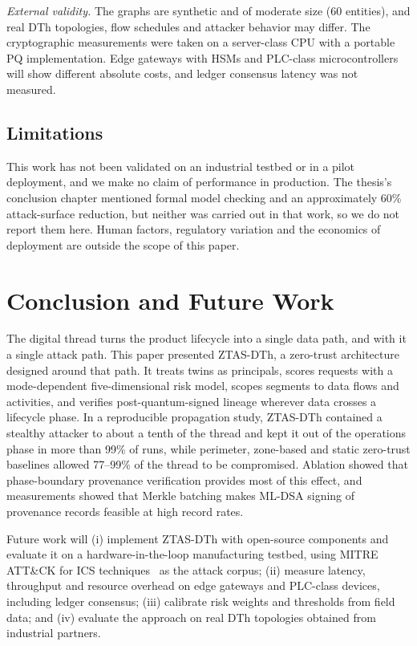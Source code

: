 \documentclass[journal]{IEEEtran}
\newcommand{\ztas}{ZTAS-DTh}
\begin{document}
\emph{External validity.} The graphs are synthetic and of moderate size (60 entities), and real DTh topologies, flow schedules and attacker behavior may differ. The cryptographic measurements were taken on a server-class CPU with a portable PQ implementation. Edge gateways with HSMs and PLC-class microcontrollers will show different absolute costs, and ledger consensus latency was not measured.

\subsection{Limitations}
This work has not been validated on an industrial testbed or in a pilot deployment, and we make no claim of performance in production. The thesis's conclusion chapter mentioned formal model checking and an approximately 60\% attack-surface reduction, but neither was carried out in that work, so we do not report them here. Human factors, regulatory variation and the economics of deployment are outside the scope of this paper.

\section{Conclusion and Future Work}
\label{sec:conclusion}
The digital thread turns the product lifecycle into a single data path, and with it a single attack path. This paper presented \ztas{}, a zero-trust architecture designed around that path. It treats twins as principals, scores requests with a mode-dependent five-dimensional risk model, scopes segments to data flows and activities, and verifies post-quantum-signed lineage wherever data crosses a lifecycle phase. In a reproducible propagation study, \ztas{} contained a stealthy attacker to about a tenth of the thread and kept it out of the operations phase in more than 99\% of runs, while perimeter, zone-based and static zero-trust baselines allowed 77--99\% of the thread to be compromised. Ablation showed that phase-boundary provenance verification provides most of this effect, and measurements showed that Merkle batching makes ML-DSA signing of provenance records feasible at high record rates.

Future work will (i) implement \ztas{} with open-source components and evaluate it on a hardware-in-the-loop manufacturing testbed, using MITRE ATT\&CK for ICS techniques~\cite{alexander2020attackics} as the attack corpus; (ii) measure latency, throughput and resource overhead on edge gateways and PLC-class devices, including ledger consensus; (iii) calibrate risk weights and thresholds from field data; and (iv) evaluate the approach on real DTh topologies obtained from industrial partners.
\end{document}
